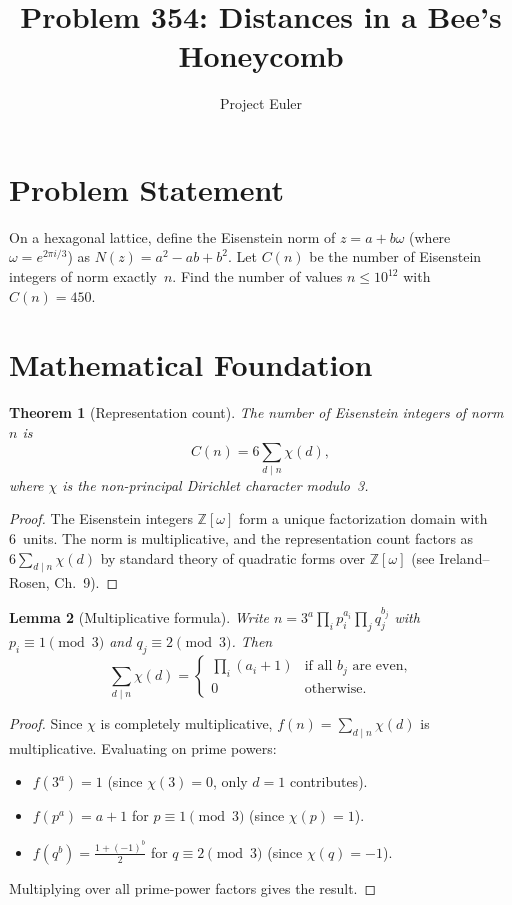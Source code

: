 \documentclass[a4paper,12pt]{article}
\title{Problem 354: Distances in a Bee's Honeycomb}
\author{Project Euler}
\date{}
\newtheorem{theorem}{Theorem}
\newtheorem{lemma}[theorem]{Lemma}
\begin{document}
\maketitle

\section{Problem Statement}

On a hexagonal lattice, define the Eisenstein norm of $z = a + b\omega$ (where $\omega = e^{2\pi i/3}$) as $N(z) = a^2 - ab + b^2$. Let $C(n)$ be the number of Eisenstein integers of norm exactly~$n$. Find the number of values $n \le 10^{12}$ with $C(n) = 450$.

\section{Mathematical Foundation}

\begin{theorem}[Representation count]
The number of Eisenstein integers of norm~$n$ is
\[
C(n) = 6\sum_{d \mid n} \chi(d),
\]
where $\chi$ is the non-principal Dirichlet character modulo~3.
\end{theorem}

\begin{proof}
The Eisenstein integers $\mathbb{Z}[\omega]$ form a unique factorization domain with 6~units. The norm is multiplicative, and the representation count factors as $6\sum_{d \mid n}\chi(d)$ by standard theory of quadratic forms over $\mathbb{Z}[\omega]$ (see Ireland--Rosen, Ch.~9).
\end{proof}

\begin{lemma}[Multiplicative formula]
Write $n = 3^a \prod_i p_i^{a_i} \prod_j q_j^{b_j}$ with $p_i \equiv 1 \pmod{3}$ and $q_j \equiv 2 \pmod{3}$. Then
\[
\sum_{d \mid n}\chi(d) = \begin{cases}
\displaystyle\prod_i (a_i + 1) & \text{if all } b_j \text{ are even,} \\
0 & \text{otherwise.}
\end{cases}
\]
\end{lemma}

\begin{proof}
Since $\chi$ is completely multiplicative, $f(n) = \sum_{d \mid n}\chi(d)$ is multiplicative. Evaluating on prime powers:
\begin{itemize}
    \item $f(3^a) = 1$ (since $\chi(3) = 0$, only $d = 1$ contributes).
    \item $f(p^a) = a + 1$ for $p \equiv 1\pmod{3}$ (since $\chi(p) = 1$).
    \item $f(q^b) = \frac{1+(-1)^b}{2}$ for $q \equiv 2\pmod{3}$ (since $\chi(q) = -1$).
\end{itemize}
Multiplying over all prime-power factors gives the result.
\end{proof}
\end{document}
